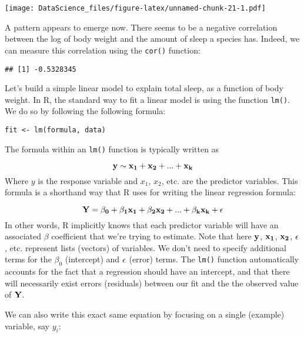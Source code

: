 \documentclass[
]{book}
\newenvironment{Shaded}{\begin{snugshade}}{\end{snugshade}}
\newcommand{\DataTypeTok}[1]{\textcolor[rgb]{0.13,0.29,0.53}{#1}}
\newcommand{\KeywordTok}[1]{\textcolor[rgb]{0.13,0.29,0.53}{\textbf{#1}}}
\newcommand{\NormalTok}[1]{#1}
\newcommand{\OperatorTok}[1]{\textcolor[rgb]{0.81,0.36,0.00}{\textbf{#1}}}
\newcommand{\StringTok}[1]{\textcolor[rgb]{0.31,0.60,0.02}{#1}}
\begin{document}
\texttt{[image: DataScience\_files/figure-latex/unnamed-chunk-21-1.pdf]}

A pattern appears to emerge now. There seems to be a negative correlation between the log of body weight and the amount of sleep a species has. Indeed, we can measure this correlation using the \texttt{cor()} function:

\begin{Shaded}
\end{Shaded}

\begin{verbatim}
## [1] -0.5328345
\end{verbatim}

Let's build a simple linear model to explain total sleep, as a function of body weight. In R, the standard way to fit a linear model is using the function \texttt{lm()}. We do so by following the following formula:

\texttt{fit\ \textless{}-\ lm(formula,\ data)}

The formula within an \texttt{lm()} function is typically written as

\[\bf{y} \sim \bf{x_1} + \bf{x_2} + ... + \bf{x_k}\]
Where \(y\) is the response variable and \(x_1\), \(x_2\), etc. are the predictor variables. This formula is a shorthand way that R uses for writing the linear regression formula:

\[\bf{Y} = \beta_0 + \beta_1 \bf{x_1} + \beta_2 \bf{x_2} + ... + \beta_k \bf{x_k} + \bf{\epsilon}\]
In other words, R implicitly knows that each predictor variable will have an associated \(\beta\) coefficient that we're trying to estimate. Note that here \(\bf{y}\), \(\bf{x_1}\), \(\bf{x_2}\), \(\bf{\epsilon}\), etc. represent lists (vectors) of variables. We don't need to specify additional terms for the \(\beta_0\) (intercept) and \(\bf{\epsilon}\) (error) terms. The \texttt{lm()} function automatically accounts for the fact that a regression should have an intercept, and that there will necessarily exist errors (residuals) between our fit and the the observed value of \(\bf{Y}\).

We can also write this exact same equation by focusing on a single (example) variable, say \(y_i\):
\end{document}
